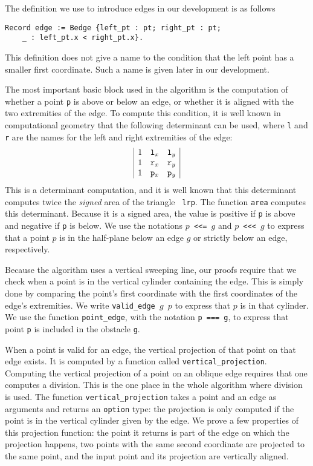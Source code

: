 \documentclass[a4paper, USenglish, cleveref, autoref, thm-restate, final]{lipics-v2021}
\begin{document}
The definition we use to introduce edges in our development is as
follows
\begin{verbatim}
Record edge := Bedge {left_pt : pt; right_pt : pt;
    _ : left_pt.x < right_pt.x}.
\end{verbatim}
This definition does not give a name to the condition that the left
point has a smaller first coordinate. Such a name is given later in
our development.

The most important basic block used in the algorithm is the
computation of whether a point {\tt p} is above or below an edge, or whether
it is aligned with the two extremities of the edge.  To compute this
condition, it is well known in computational geometry \cite{KnuthAxiomsHulls}
that the
following determinant can be used, where {\tt l} and {\tt r} are the
names for the left and right extremities of the edge:
\[\begin{array}{|ccc|}
1 & {\tt l}_x & {\tt l}_y\\
1 & {\tt r}_x & {\tt r}_y\\
1 & {\tt p}_x & {\tt p}_y\\
\end{array}\]
This is a determinant computation, and it is well known that this
determinant computes twice the {\em signed} area of the triangle {\tt
  lrp}.  The function {\tt area} computes this determinant.
Because it is a signed area, the value is positive if {\tt p}
is above and negative if {\tt p} is below.  We use the notations
{\tt \(p\) <{}<{}= \(g\)} and {\tt \(p\) <{}<{}< \(g\)} to express that a point
\(p\) is in the half-plane below an edge \(g\) or strictly below an
edge, respectively.

Because the algorithm uses a vertical sweeping line, our proofs
require that we check when a point is in the vertical cylinder
containing the edge.  This is simply done by comparing the point's
first coordinate with the first coordinates of the edge's extremities.
We write {\tt valid\_edge \(g\) \(p\)} to express that \(p\) is in
that cylinder.  We use the function {\tt point\_edge}, with the
notation {\tt p === g}, to express that
point {\tt p} is included in the obstacle {\tt g}.

When a point is valid for an edge, the vertical projection of that
point on that edge exists.  It is computed by a function called
{\tt vertical\_projection}.  Computing the vertical projection of a
point on an oblique edge requires that one computes a division. This
is the one place in the whole algorithm where division is used.
The function {\tt vertical\_projection} takes a point and an edge as
arguments and returns an {\tt option} type:
the projection is only computed if the point is in the vertical
cylinder given by the edge.  We prove a few properties of this
projection function: the point it returns is part of the edge on which
the projection happens, two points with the same second coordinate are
projected to the same point, and the input point and its projection
are vertically aligned.
\end{document}
